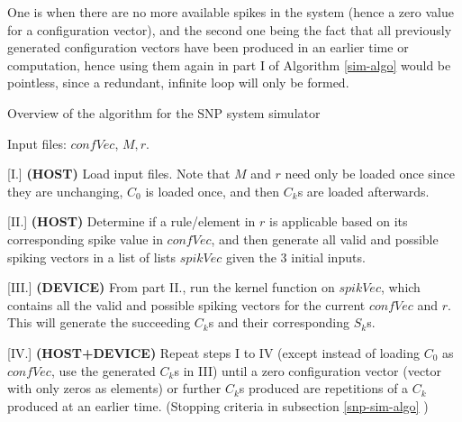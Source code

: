 \documentclass{svmultm}
\newcommand{\redmark}[1]{\color{red} #1 \color{black}}
\newcommand{\sredmark}[2]{\color{red} \sout{#1} #2 \color{black}}
\begin{document}
One is when there are no more available spikes in the system (hence a
zero value for a configuration vector), and the second one
being the fact that all previously generated configuration
vectors have been produced in an earlier time or
computation, hence using them again in part I of Algorithm \ref{sim-algo} would be pointless, since a
redundant, infinite loop will only be formed.

\begin{algorithm}                      %
\caption{Overview of the algorithm for the SNP system simulator}          %
\label{sim-algo}                           %
\begin{algorithmic}                    %
\REQUIRE Input files: $confVec$, $M,r$.

[I.] \textbf{(HOST)} Load input files.
Note that $M$ and $r$ need only be loaded once since they are unchanging, $C_0$ is loaded once, and then $C_k$s are loaded afterwards.


[II.] \textbf{(HOST)} Determine if a rule/element in $r$ 
is applicable based on its corresponding spike value 
in $confVec$, and then generate all valid and
possible spiking vectors in a list of lists $spikVec$ given the 3 initial inputs.


[III.] \textbf{(DEVICE)} From part II., run the kernel 
function on $spikVec$, which contains all 
the valid and possible spiking vectors for 
the current $confVec$ and $r$. This will 
generate the succeeding $C_k$s and their corresponding $S_k$s.


[IV.] \textbf{(HOST+DEVICE)} Repeat steps I to IV (except instead of loading $C_0$ as $confVec$, use the generated $C_k$s in III) until
a zero configuration vector (vector with 
only zeros as elements) or further $C_k$s
produced are repetitions of a $C_k$
produced at an earlier time. (Stopping criteria in subsection \ref{snp-sim-algo} )
\end{algorithmic}
\end{algorithm}	
\end{document}
